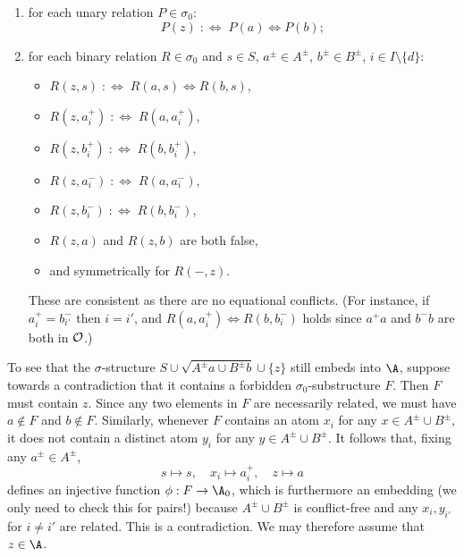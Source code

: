 \begin{claimproof}
\begin{enumerate}
    \item for each unary relation $P \in \sigma_0$:
    \[
        P(z) \;:\Longleftrightarrow\; P(a) \iff P(b);
    \]
    \item for each binary relation $R \in \sigma_0$ and $s \in S$, $a^\pm \in A^\pm$, $b^\pm \in B^\pm$, $i \in I \setminus \{d\}$:
    \begin{itemize}
        \item $R(z, s) \;:\Longleftrightarrow\; R(a, s) \iff R(b, s)$,
        \item $R(z, a^+_i) \;:\Longleftrightarrow\; R(a, a^+_i)$,
        \item $R(z, b^+_i) \;:\Longleftrightarrow\; R(b, b^+_i)$,
        \item $R(z, a^-_i) \;:\Longleftrightarrow\; R(a, a^-_i)$,
        \item $R(z, b^-_i) \;:\Longleftrightarrow\; R(b, b^-_i)$,
        \item $R(z, a)$ and $R(z,b)$ are both false,
        \item and symmetrically for $R(-, z)$.
    \end{itemize}
    These are consistent as there are no equational conflicts.
    (For instance, if $a^+_i = b^-_{i'}$ then $i = i'$, and $R(a, a^+_i) \iff R(b, b^-_i)$ holds since $a^+ a$ and $b^- b$ are both in $\cal O$.)
\end{enumerate}
To see that the $\sigma$-structure $S \cup \sqrt{A^\pm a \cup B^\pm b} \cup \{z\}$ still embeds into $\A$, 
suppose towards a contradiction that it contains a forbidden $\sigma_0$-substructure $F$.
Then $F$ must contain $z$.
Since any two elements in $F$ are necessarily related, we must have $a \not\in F$ and $b \not\in F$.
Similarly, whenever $F$ contains an atom $x_i$ for any $x\in A^\pm\cup B^\pm$, it does not contain a distinct atom $y_i$ for any $y\in A^\pm\cup B^\pm$.
It follows that, fixing any $a^\pm\in A^\pm$,
\[
    s \mapsto s,\quad x_i \mapsto a^+_i,\quad z \mapsto a
\]
defines an injective function $\phi : F \to \A_0$,
which is furthermore an embedding (we only need to check this for pairs!) because $A^\pm \cup B^\pm$ is conflict-free and any $x_i, y_{i'}$ for $i \neq i'$ are related.
This is a contradiction. We may therefore assume that $z \in \A$.


\end{claimproof}
